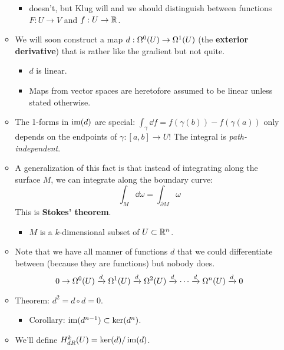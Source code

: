 \documentclass[../notes.tex]{subfiles}
\begin{document}
\begin{itemize}
\begin{itemize}
        \begin{itemize}
            \item \textcite{bib:DifferentialForms} doesn't, but Klug will and we should distinguish between functions $F:U\to V$ and $f:U\to\R$.
        \end{itemize}
        \item We will soon construct a map $d:\ome[0]{U}\to\ome[1]{U}$ (the \textbf{exterior derivative}) that is rather like the gradient but not quite.
        \begin{itemize}
            \item $d$ is linear.
            \item Maps from vector spaces are heretofore assumed to be linear unless stated otherwise.
        \end{itemize}
        \item The 1-forms in $\im(d)$ are special: $\int_\gamma\dd{f}=f(\gamma(b))-f(\gamma(a))$ only depends on the endpoints of $\gamma:[a,b]\to U$! The integral is \emph{path-independent}.
        \item A generalization of this fact is that instead of integrating along the surface $M$, we can integrate along the boundary curve:
        \begin{equation*}
            \int_M\dd{\omega} = \int_{\partial M}\omega
        \end{equation*}
        This is \textbf{Stokes' theorem}.
        \begin{itemize}
            \item $M$ is a $k$-dimensional subset of $U\subset\R^n$.
        \end{itemize}
        \item Note that we have all manner of functions $d$ that we could differentiate between (because they are functions) but nobody does.
        \begin{equation*}
            0 \rightarrow \ome[0]{U}
            \xrightarrow{d} \ome[1]{U}
            \xrightarrow{d} \ome[2]{U}
            \xrightarrow{d} \cdots
            \xrightarrow{d} \ome[n]{U}
            \xrightarrow{d} 0
        \end{equation*}
        \item Theorem: $d^2=d\circ d=0$.
        \begin{itemize}
            \item Corollary: $\im(d^{n-1})\subset\ker(d^n)$.
        \end{itemize}
        \item We'll define $H^k_{dR}(U)=\ker(d)/\im(d)$.

\end{itemize}
\end{itemize}
\end{document}

